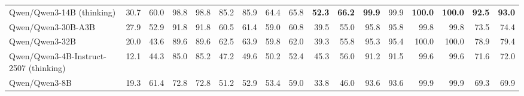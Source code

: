 \documentclass{article}
\begin{document}
\begin{table}[htbp]
\begin{threeparttable}
\begin{adjustbox}{max width=\textwidth}
\begin{tabular}{lrrrrrrrrrrrrrrrr}
Qwen/Qwen3-14B (thinking) & \cellcolor[HTML]{CDE4EF}30.7 & \cellcolor[HTML]{C9E2EE}60.0 & \cellcolor[HTML]{93C5DE}98.8 & \cellcolor[HTML]{93C5DE}98.8 & \cellcolor[HTML]{9CCAE1}85.2 & \cellcolor[HTML]{9FCBE1}85.9 & \cellcolor[HTML]{A6D0E4}64.4 & \cellcolor[HTML]{A9D1E5}65.8 & \cellcolor[HTML]{92C5DE}\textbf{52.3} & \cellcolor[HTML]{92C5DE}\textbf{66.2} & \cellcolor[HTML]{92C5DE}\textbf{99.9} & \cellcolor[HTML]{92C5DE}99.9 & \cellcolor[HTML]{92C5DE}\textbf{100.0} & \cellcolor[HTML]{92C5DE}\textbf{100.0} & \cellcolor[HTML]{92C5DE}\textbf{92.5} & \cellcolor[HTML]{92C5DE}\textbf{93.0} \\
Qwen/Qwen3-30B-A3B & \cellcolor[HTML]{DBECF4}27.9 & \cellcolor[HTML]{E3F0F6}52.9 & \cellcolor[HTML]{A2CDE3}91.8 & \cellcolor[HTML]{A2CDE3}91.8 & \cellcolor[HTML]{D8EAF3}60.5 & \cellcolor[HTML]{EEF6FA}61.4 & \cellcolor[HTML]{B7D8E9}59.0 & \cellcolor[HTML]{BADAEA}60.8 & \cellcolor[HTML]{C7E1EE}39.5 & \cellcolor[HTML]{C7E1EE}55.0 & \cellcolor[HTML]{9AC9E0}95.8 & \cellcolor[HTML]{9FCCE2}95.8 & \cellcolor[HTML]{92C5DE}99.8 & \cellcolor[HTML]{93C5DE}99.8 & \cellcolor[HTML]{BEDCEB}73.5 & \cellcolor[HTML]{C3DFEC}74.4 \\
Qwen/Qwen3-32B & \cellcolor[HTML]{FEFAF8}20.0 & \cellcolor[HTML]{FEFAF9}43.6 & \cellcolor[HTML]{A7D0E4}89.6 & \cellcolor[HTML]{A7D0E4}89.6 & \cellcolor[HTML]{D3E7F1}62.5 & \cellcolor[HTML]{E6F2F7}63.9 & \cellcolor[HTML]{B4D7E8}59.8 & \cellcolor[HTML]{B6D8E9}62.0 & \cellcolor[HTML]{C8E1EE}39.3 & \cellcolor[HTML]{C3DFED}55.8 & \cellcolor[HTML]{9CCAE1}95.3 & \cellcolor[HTML]{A1CDE2}95.4 & \cellcolor[HTML]{92C5DE}100.0 & \cellcolor[HTML]{92C5DE}100.0 & \cellcolor[HTML]{B2D6E7}78.9 & \cellcolor[HTML]{B6D8E8}79.4 \\
Qwen/Qwen3-4B-Instruct-2507 (thinking) & \cellcolor[HTML]{FAD8CA}12.1 & \cellcolor[HTML]{FEFCFC}44.3 & \cellcolor[HTML]{B1D5E7}85.0 & \cellcolor[HTML]{B1D5E7}85.2 & \cellcolor[HTML]{F8FBFD}47.2 & \cellcolor[HTML]{FCECE5}49.6 & \cellcolor[HTML]{D2E7F1}50.2 & \cellcolor[HTML]{D7EAF3}52.4 & \cellcolor[HTML]{AFD4E6}45.3 & \cellcolor[HTML]{C2DFEC}56.0 & \cellcolor[HTML]{A4CFE3}91.2 & \cellcolor[HTML]{AED4E6}91.5 & \cellcolor[HTML]{92C5DE}99.6 & \cellcolor[HTML]{94C6DE}99.6 & \cellcolor[HTML]{C3DFEC}71.6 & \cellcolor[HTML]{C9E2EE}72.0 \\
Qwen/Qwen3-8B & \cellcolor[HTML]{FEF7F4}19.3 & \cellcolor[HTML]{C4DFED}61.4 & \cellcolor[HTML]{CCE4EF}72.8 & \cellcolor[HTML]{CCE4EF}72.8 & \cellcolor[HTML]{EEF6FA}51.2 & \cellcolor[HTML]{FDF5F1}52.9 & \cellcolor[HTML]{C8E2EE}53.4 & \cellcolor[HTML]{C0DDEC}59.0 & \cellcolor[HTML]{DFEEF5}33.8 & \cellcolor[HTML]{F2F8FB}46.0 & \cellcolor[HTML]{9FCCE2}93.6 & \cellcolor[HTML]{A7D0E4}93.6 & \cellcolor[HTML]{92C5DE}99.9 & \cellcolor[HTML]{92C5DE}99.9 & \cellcolor[HTML]{C8E2EE}69.3 & \cellcolor[HTML]{CEE5F0}69.9 \\

\end{tabular}
\end{adjustbox}
\end{threeparttable}
\end{table}
\end{document}
